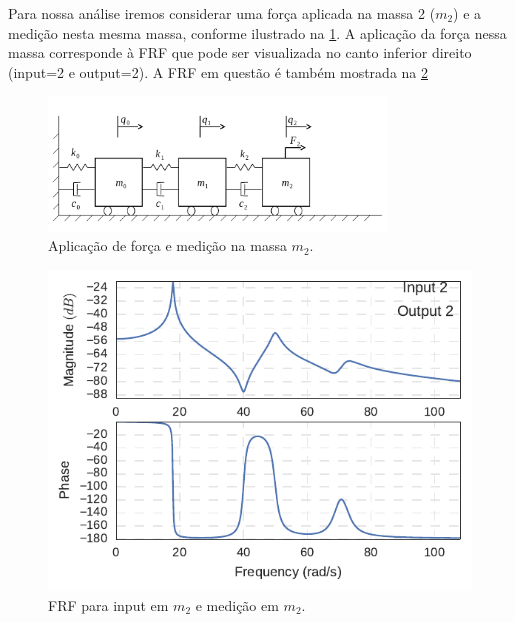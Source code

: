 Para nossa análise iremos considerar uma força aplicada na massa 2 ($m_2$) e a medição nesta mesma massa, conforme ilustrado na \cref{fig:sistemaf}. A aplicação da força nessa massa corresponde à FRF que pode ser visualizada no canto inferior direito (input=2 e output=2). A FRF em questão é também mostrada na \cref{fig:FRF_i2_o2}

\begin{figure}
	\centering
	\includegraphics[width=0.8\textwidth]{IMGS/sistemaf}
	\caption{Aplicação de força e medição na massa $m_2$.}
	\label{fig:sistemaf}
\end{figure}

\begin{figure}
	\centering
	\includegraphics[scale=1]{IMGS/FRF_i2_o2}
	\caption{FRF para input em $m_2$ e medição em $m_2$.}
	\label{fig:FRF_i2_o2}
\end{figure}



